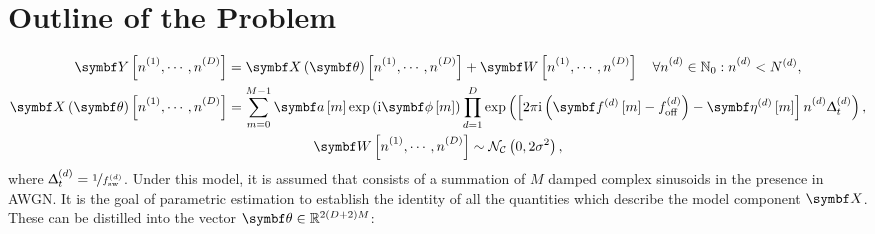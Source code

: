 \section{Outline of the Problem}
\begin{subequations}
    \begin{gather}
        \bY \left[\none, \cdots, \nD\right] =
            \bX \left( \bth \right) \left[\none, \cdots, \nD\right] +
            \bW \left[\none, \cdots, \nD\right]
            \quad \forall \nd \in \mathbb{N}_0 : \nd < \Nd,\label{eq:y}
             \\
        \bX \left(\bth\right) \left[\none, \cdots, \nD\right] =
        \sum_{m=0}^{M-1} \bdam \exp\left(
                \iu \bdphim
            \right)
            \prod_{d=1}^D
            \exp\left(
                \left[ 2 \pi \iu \left(\bdfdm - \foffd\right) - \bdetadm \right] \nd \Dtd
            \right),
            \label{eq:x}
            \\
        \bW \left[\none, \cdots, \nD\right] \sim
            \mathcal{N_C}\left(0, 2\sigma^2\right),
    \end{gather}
\end{subequations}%
where $\Updelta_t^{(d)} = \nicefrac{1}{f_{\mathrm{sw}}^{(d)}}$. Under this model, it is assumed that
 consists of a summation of $M$ damped complex sinusoids in the
presence in \ac{AWGN}. It is the goal of parametric estimation to establish the
identity of all the quantities which describe the model component $\bX$. These
can be distilled into the vector $\bth \in \mathbb{R}^{2(D + 2)M}$:


